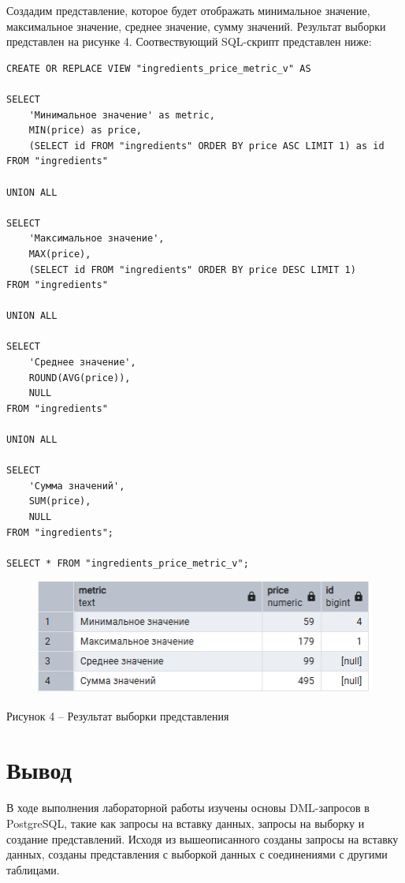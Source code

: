 \documentclass[a4paper,14pt]{extarticle}
\begin{document}
  Создадим представление, которое будет отображать минимальное значение, максимальное значение, среднее значение, сумму значений. Результат выборки представлен на рисунке 4. Соотвествующий SQL-скрипт представлен ниже:

  \noindent
  \begin{Verbatim}[tabsize=4,fontsize=\small]
CREATE OR REPLACE VIEW "ingredients_price_metric_v" AS

SELECT
    'Минимальное значение' as metric,
    MIN(price) as price,
    (SELECT id FROM "ingredients" ORDER BY price ASC LIMIT 1) as id
FROM "ingredients"

UNION ALL

SELECT
    'Максимальное значение',
    MAX(price),
    (SELECT id FROM "ingredients" ORDER BY price DESC LIMIT 1)
FROM "ingredients"

UNION ALL

SELECT
    'Среднее значение',
    ROUND(AVG(price)),
    NULL
FROM "ingredients"

UNION ALL

SELECT
    'Сумма значений',
    SUM(price),
    NULL
FROM "ingredients";

SELECT * FROM "ingredients_price_metric_v";
  \end{Verbatim}

  \begin{figure}[h]
    \centering
    \includegraphics[width=0.75\linewidth]{img/view-4}
  \end{figure}
  \begin{center}
    Рисунок 4 – Результат выборки представления
  \end{center}

  \section*{Вывод}
  В ходе выполнения лабораторной работы изучены основы DML-запросов в PostgreSQL, такие как запросы на вставку данных, запросы на выборку и создание представлений. Исходя из вышеописанного созданы запросы на вставку данных, созданы представления с выборкой данных с соединениями с другими таблицами.
\end{document}
